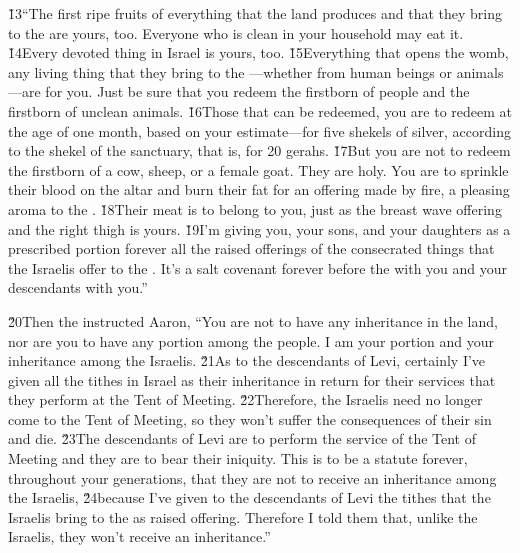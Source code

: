 \v{13}``The first ripe fruits of everything that the land produces and that they bring to the  are yours, too. Everyone who is clean in your household may eat it. \v{14}Every devoted thing in Israel is yours, too. \v{15}Everything that opens the womb, any living thing that they bring to the ---whether from human beings or animals---are for you. Just be sure that you redeem the firstborn of people and the firstborn of unclean animals. \v{16}Those that can be redeemed, you are to redeem at the age of one month, based on your estimate---for five shekels of silver, according to the shekel of the sanctuary, that is, for 20 gerahs. \v{17}But you are not to redeem the firstborn of a cow, sheep, or a female goat. They are holy. You are to sprinkle their blood on the altar and burn their fat for an offering made by fire, a pleasing aroma to the . \v{18}Their meat is to belong to you, just as the breast wave offering and the right thigh is yours. \v{19}I'm giving you, your sons, and your daughters as a prescribed portion forever all the raised offerings of the consecrated things that the Israelis offer to the . It's a salt covenant forever before the  with you and your descendants with you.''

\v{20}Then the  instructed Aaron, ``You are not to have any inheritance in the land, nor are you to have any portion among the people. I am your portion and your inheritance among the Israelis. \v{21}As to the descendants of Levi, certainly I've given all the tithes in Israel as their inheritance in return for their services that they perform at the Tent of Meeting. \v{22}Therefore, the Israelis need no longer come to the Tent of Meeting, so they won't suffer the consequences of their sin and die. \v{23}The descendants of Levi are to perform the service of the Tent of Meeting and they are to bear their iniquity. This is to be a statute forever, throughout your generations, that they are not to receive an inheritance among the Israelis, \v{24}because I've given to the descendants of Levi the tithes that the Israelis bring to the  as raised offering. Therefore I told them that, unlike the Israelis, they won't receive an inheritance.''

